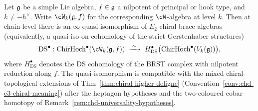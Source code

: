 \begin{theorem}%
\label{thm:chd-ds-hochschild}%
%
Let $\mathfrak{g}$ be a simple Lie algebra, $f \in \mathfrak{g}$ a nilpotent of principal
or hook type, and $k \ne -h^{\vee}$. Write $\cW_k(\fg, f)$ for the
corresponding $\cW$-algebra at level $k$. Then at chain level there is
an $\infty$-quasi-isomorphism of $E_2$-chiral brace algebras (equivalently,
a quasi-iso on cohomology of the strict Gerstenhaber structures)
\begin{equation}\label{eq:chd-ds-hh}
 \mathrm{DS}^\bullet:
 \ChirHoch^\bullet(\cW_k(\fg, f)) \;\xrightarrow{\;\sim\;}\;
 H^\bullet_{\mathrm{DS}}\bigl(\ChirHoch^\bullet(V_k(\fg))\bigr),
\end{equation}
where $H^\bullet_{\mathrm{DS}}$ denotes the DS cohomology of the
BRST complex with nilpotent reduction along $f$. The quasi-isomorphism
is compatible with the mixed chiral-topological extensions of
Thm~\ref{thm:chiral-higher-deligne}
(Convention~\ref{conv:chd-e3-chiral-meaning}) after the heptagon
hypotheses and the two-coloured cobar homotopy of
Remark~\ref{rem:chd-universality-hypotheses}.
\end{theorem}


